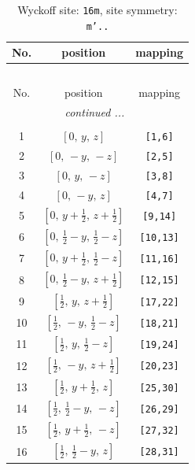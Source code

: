 \documentclass[fleqn,8pt]{jsarticle}
\begin{document}
\renewcommand{\arraystretch}{1.2}
\begin{longtable}{ccc}
\caption{Wyckoff site: {\tt 16m}, site symmetry: {\tt m'..}}
 \\
 \hline \hline
No. & position & mapping \\ \hline \endfirsthead

\multicolumn{2}{l}{\tablename\ \thetable{}} \\
 \hline \hline
No. & position & mapping \\ \hline \endhead

 \hline \hline
\multicolumn{2}{r}{\footnotesize\it continued ...} \\ \endfoot

 \hline \hline
\multicolumn{2}{r}{} \\ \endlastfoot

1 & $\left[ 0,\, y,\, z \right]$ & {\tt [1,6]} \\ \hline
2 & $\left[ 0,\, - y,\, - z \right]$ & {\tt [2,5]} \\ \hline
3 & $\left[ 0,\, y,\, - z \right]$ & {\tt [3,8]} \\ \hline
4 & $\left[ 0,\, - y,\, z \right]$ & {\tt [4,7]} \\ \hline
5 & $\left[ 0,\, y + \frac{1}{2},\, z + \frac{1}{2} \right]$ & {\tt [9,14]} \\ \hline
6 & $\left[ 0,\, \frac{1}{2} - y,\, \frac{1}{2} - z \right]$ & {\tt [10,13]} \\ \hline
7 & $\left[ 0,\, y + \frac{1}{2},\, \frac{1}{2} - z \right]$ & {\tt [11,16]} \\ \hline
8 & $\left[ 0,\, \frac{1}{2} - y,\, z + \frac{1}{2} \right]$ & {\tt [12,15]} \\ \hline
9 & $\left[ \frac{1}{2},\, y,\, z + \frac{1}{2} \right]$ & {\tt [17,22]} \\ \hline
10 & $\left[ \frac{1}{2},\, - y,\, \frac{1}{2} - z \right]$ & {\tt [18,21]} \\ \hline
11 & $\left[ \frac{1}{2},\, y,\, \frac{1}{2} - z \right]$ & {\tt [19,24]} \\ \hline
12 & $\left[ \frac{1}{2},\, - y,\, z + \frac{1}{2} \right]$ & {\tt [20,23]} \\ \hline
13 & $\left[ \frac{1}{2},\, y + \frac{1}{2},\, z \right]$ & {\tt [25,30]} \\ \hline
14 & $\left[ \frac{1}{2},\, \frac{1}{2} - y,\, - z \right]$ & {\tt [26,29]} \\ \hline
15 & $\left[ \frac{1}{2},\, y + \frac{1}{2},\, - z \right]$ & {\tt [27,32]} \\ \hline
16 & $\left[ \frac{1}{2},\, \frac{1}{2} - y,\, z \right]$ & {\tt [28,31]} \\
\end{longtable}
\end{document}
